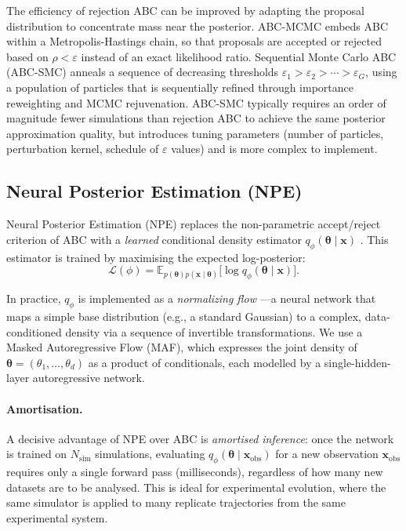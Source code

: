 \documentclass[11pt]{article}
\newcommand{\btheta}{\boldsymbol{\theta}}
\newcommand{\bx}{\mathbf{x}}
\newcommand{\E}{\mathbb{E}}
\begin{document}
The efficiency of rejection ABC can be improved by adapting the proposal
distribution to concentrate mass near the posterior.
ABC-MCMC \citep{marjoram2003markov} embeds ABC within a Metropolis-Hastings
chain, so that proposals are accepted or rejected based on
$\rho < \varepsilon$ instead of an exact likelihood ratio.
Sequential Monte Carlo ABC (ABC-SMC) \citep{sisson2007sequential,
del2012adaptive} anneals a sequence of decreasing thresholds
$\varepsilon_1 > \varepsilon_2 > \cdots > \varepsilon_G$, using a
population of particles that is sequentially refined through importance
reweighting and MCMC rejuvenation.
ABC-SMC typically requires an order of magnitude fewer simulations than
rejection ABC to achieve the same posterior approximation quality, but
introduces tuning parameters (number of particles, perturbation kernel,
schedule of $\varepsilon$ values) and is more complex to implement.

\subsection{Neural Posterior Estimation (NPE)}
\label{sec:npe}

Neural Posterior Estimation (NPE) replaces the non-parametric accept/reject
criterion of ABC with a \emph{learned} conditional density estimator
$q_\phi(\btheta\mid\bx)$ \citep{papamakarios2016fast,lueckmann2017flexible,
greenberg2019automatic}.
This estimator is trained by maximising the expected log-posterior:
\begin{equation}
  \mathcal{L}(\phi) = \E_{p(\btheta)p(\bx\mid\btheta)}
    \bigl[\log q_\phi(\btheta\mid\bx)\bigr].
  \label{eq:npe_loss}
\end{equation}

In practice, $q_\phi$ is implemented as a \emph{normalizing flow}
\citep{papamakarios2021normalizing}---a neural network that maps a simple base
distribution (e.g., a standard Gaussian) to a complex, data-conditioned
density via a sequence of invertible transformations.
We use a Masked Autoregressive Flow (MAF), which expresses the joint density
of $\btheta = (\theta_1,\ldots,\theta_d)$ as a product of conditionals,
each modelled by a single-hidden-layer autoregressive network.

\paragraph{Amortisation.}
A decisive advantage of NPE over ABC is \emph{amortised inference}: once the
network is trained on $N_\mathrm{sim}$ simulations, evaluating
$q_\phi(\btheta\mid\bx_\mathrm{obs})$ for a new observation $\bx_\mathrm{obs}$
requires only a single forward pass (milliseconds), regardless of how
many new datasets are to be analysed.
This is ideal for experimental evolution, where the same simulator is applied
to many replicate trajectories from the same experimental system.
\end{document}
